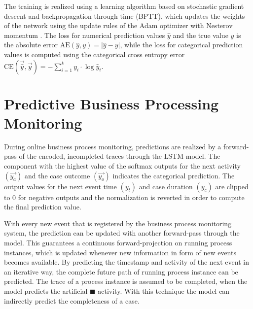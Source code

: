 The training is realized using a learning algorithm based on stochastic gradient descent and backpropagation through time (BPTT), which updates the weights of the network using the update rules of the Adam optimizer with Nesterov momentum \cite{dozat2016incorporating}.
The loss for numerical prediction values $\hat{y}$ and the true value $y$ is the absolute error $\text{AE}(\hat{y},y)=|\hat{y} - y|$, while the loss for categorical prediction values is computed using the categorical cross entropy error $\text{CE}(\vec{\hat{y}}, \vec{y}) = - \sum_{i=1}^{k} y_i \cdot \log \hat{y}_i$.

\section{Predictive Business Processing Monitoring}

During online business process monitoring, predictions are realized by a forward-pass of the encoded, incompleted traces through the LSTM model.
The component with the highest value of the softmax outputs for the next activity $(\vec{y_a})$ and the case outcome $(\vec{y_o})$ indicates the categorical prediction.
The output values for the next event time $(y_t)$ and case duration  $(y_c)$ are clipped to 0 for negative outputs and the normalization is reverted in order to compute the final prediction value.

With every new event that is registered by the business process monitoring system, the prediction can be updated with another forward-pass through the model.
This guarantees a continuous forward-projection on running process instances, which is updated whenever new information in form of new events becomes available.
By predicting the timestamp and activity of the next event in an iterative way, the complete future path of running process instance can be predicted.
The trace of a process instance is assumed to be completed, when the model predicts the artificial $\blacksquare$ activity.
With this technique the model can indirectly predict the completeness of a case.